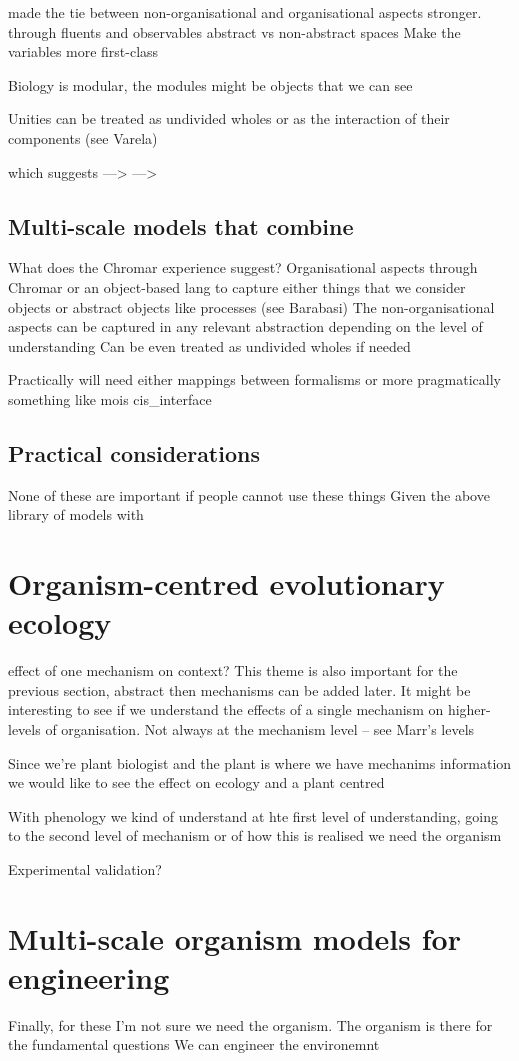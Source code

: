 \documentclass[phd]{infthesis}
\begin{document}
made the tie between non-organisational and organisational aspects
stronger. through fluents and observables
abstract vs non-abstract spaces
Make the variables more first-class

Biology is modular, the modules might be objects that we can see

Unities can be treated as undivided wholes or
as the interaction of their components (see Varela)

which suggests --->
--->


\subsection{Multi-scale models that combine}
What does the Chromar experience suggest?
Organisational aspects through Chromar or an object-based lang to capture either
things that we consider objects or abstract objects like processes (see
Barabasi)
The non-organisational aspects can be captured in any relevant abstraction
depending on the level of understanding Can be even treated as undivided wholes
if needed

Practically will need either mappings between formalisms or more pragmatically
something like mois cis\_interface


\subsection{Practical considerations}
None of these are important if people cannot use these things
Given the above library of models with 



\section{Organism-centred evolutionary ecology}
effect of one mechanism on context? This theme is also important for the
previous section, abstract then mechanisms can be added later. It might be
interesting to see if we understand the effects of a single mechanism on
higher-levels of organisation.
Not always at the mechanism level -- see Marr's levels

Since we're plant biologist and the plant is where we have mechanims information
we would like to see the effect on ecology and a plant centred

With phenology we kind of understand at hte first level of understanding, going
to the second level of mechanism or of how this is realised we need the organism


Experimental validation?


\section{Multi-scale organism models for engineering}
Finally,
for these I'm not sure we need the organism. The organism is there for the
fundamental questions
We can engineer the environemnt



















\printbibliography[heading=bibintoc]
\end{document}
